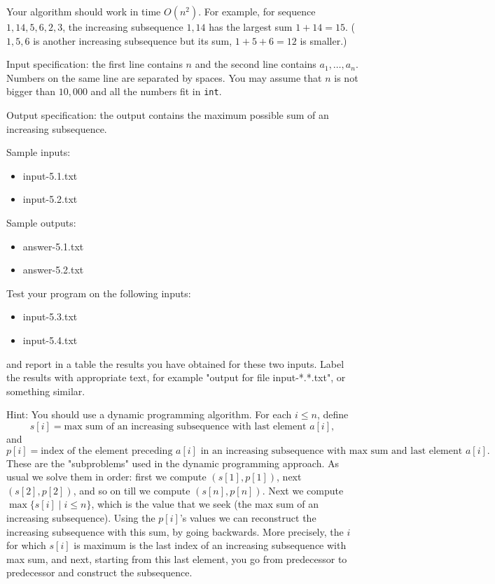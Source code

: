 \documentclass[11pt]{article}
\begin{document}
Your algorithm should work in time $O(n^2)$. For example, for sequence $1, 14, 5, 6, 2, 3$, the increasing subsequence $1, 14$ has the largest sum $1 + 14 = 15$. ($1, 5, 6$ is another increasing subsequence but its sum, $1 + 5 + 6 = 12$ is smaller.)

Input specification: the first line contains $n$ and the second line contains $a_1, \ldots, a_n$. Numbers on the same line are separated by spaces. You may assume that $n$ is not bigger than $10,000$ and all the numbers fit in \texttt{int}.

Output specification: the output contains the maximum possible sum of an increasing subsequence.

Sample inputs:
\begin{itemize}
\item input-5.1.txt
\item input-5.2.txt
\end{itemize}

Sample outputs:
\begin{itemize}
\item answer-5.1.txt
\item answer-5.2.txt
\end{itemize}

Test your program on the following inputs:
\begin{itemize}
\item input-5.3.txt
\item input-5.4.txt
\end{itemize}
and report in a table the results you have obtained for these two inputs. Label the results with appropriate text, for example "output for file input-*.*.txt", or something similar.

Hint: You should use a dynamic programming algorithm. For each $i \le n$, define
\[
s[i] = \text{max sum of an increasing subsequence with last element } a[i],
\]
and
\[
p[i] = \text{index of the element preceding } a[i] \text{ in an increasing subsequence with max sum and last element } a[i].
\]
These are the "subproblems" used in the dynamic programming approach. As usual we solve them in order: first we compute $(s[1], p[1])$, next $(s[2], p[2])$, and so on till we compute $(s[n], p[n])$. Next we compute $\max\{s[i] \mid i \le n\}$, which is the value that we seek (the max sum of an increasing subsequence). Using the $p[i]$'s values we can reconstruct the increasing subsequence with this sum, by going backwards. More precisely, the $i$ for which $s[i]$ is maximum is the last index of an increasing subsequence with max sum, and next, starting from this last element, you go from predecessor to predecessor and construct the subsequence.
\end{document}
